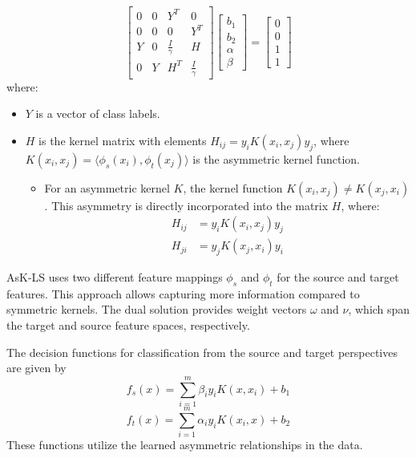 \[
\begin{bmatrix}
0 & 0 & Y^T & 0 \\
0 & 0 & 0 & Y^T \\
Y & 0 & \frac{I}{\gamma} & H \\
0 & Y & H^T & \frac{I}{\gamma}
\end{bmatrix}
\begin{bmatrix}
b_1 \\
b_2 \\
\alpha \\
\beta
\end{bmatrix}
=
\begin{bmatrix}
0 \\
0 \\
1 \\
1
\end{bmatrix}
\]
where:
\begin{itemize}
	\item \( Y \) is a vector of class labels.
	\item \( H \) is the kernel matrix with elements \( H_{ij} = y_i K(x_i, x_j) y_j \), where \( K(x_i, x_j) = \langle \phi_s(x_i), \phi_t(x_j) \rangle \) is the asymmetric kernel function.
		\begin{itemize}
			\item For an asymmetric kernel \( K \), the kernel function \( K(x_i, x_j) \neq K(x_j, x_i) \). This asymmetry is directly incorporated into the matrix \( H \), where:
				\begin{align*}
					H_{ij} &= y_i K(x_i, x_j) y_j \\
					H_{ji} &= y_j K(x_j, x_i) y_i
				\end{align*}
		\end{itemize}
\end{itemize}

AsK-LS uses two different feature mappings \( \phi_s \) and \( \phi_t \) for the source and target features. This approach allows capturing more information compared to symmetric kernels. The dual solution provides weight vectors \( \omega \) and \( \nu \), which span the target and source feature spaces, respectively.

The decision functions for classification from the source and target perspectives are given by
\[
f_s(x) = \sum_{i=1}^m \beta_i y_i K(x, x_i) + b_1
\]
\[
f_t(x) = \sum_{i=1}^m \alpha_i y_i K(x_i, x) + b_2
\]
These functions utilize the learned asymmetric relationships in the data.



